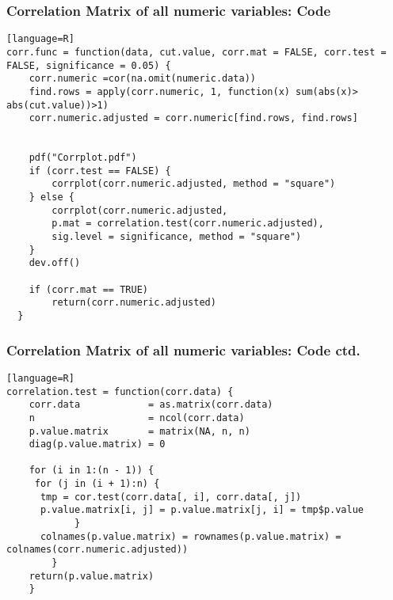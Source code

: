 \begin{frame}[fragile]
\frametitle{Correlation Matrix of all numeric variables: Code}

\begin{lstlisting}[basicstyle=\tiny][language=R]
corr.func = function(data, cut.value, corr.mat = FALSE, corr.test = FALSE, significance = 0.05) {
	corr.numeric =cor(na.omit(numeric.data)) 
	find.rows = apply(corr.numeric, 1, function(x) sum(abs(x)> 					abs(cut.value))>1)
	corr.numeric.adjusted = corr.numeric[find.rows, find.rows]
	

    pdf("Corrplot.pdf")
    if (corr.test == FALSE) {
        corrplot(corr.numeric.adjusted, method = "square")
    } else {
        corrplot(corr.numeric.adjusted, 
        p.mat =	correlation.test(corr.numeric.adjusted),
        sig.level = significance, method = "square")
    }
    dev.off()
    
    if (corr.mat == TRUE) 
        return(corr.numeric.adjusted)
  }

\end{lstlisting}

\end{frame}
\begin{frame}[fragile]
\frametitle{Correlation Matrix of all numeric variables: Code ctd.}
\begin{lstlisting}[basicstyle=\tiny][language=R]
correlation.test = function(corr.data) {
    corr.data            = as.matrix(corr.data)
    n                    = ncol(corr.data)
    p.value.matrix       = matrix(NA, n, n)
    diag(p.value.matrix) = 0
    
    for (i in 1:(n - 1)) {
     for (j in (i + 1):n) {
      tmp = cor.test(corr.data[, i], corr.data[, j])            
      p.value.matrix[i, j] = p.value.matrix[j, i] = tmp$p.value 
            }
      colnames(p.value.matrix) = rownames(p.value.matrix) =          		  colnames(corr.numeric.adjusted))
        }
	return(p.value.matrix)
    }
\end{lstlisting}

\end{frame}

